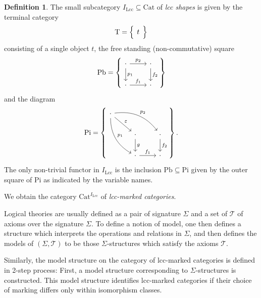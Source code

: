 \documentclass[a4paper]{article}
\theoremstyle{remark}
\theoremstyle{definition}
\newtheorem{definition}[theorem]{Definition}
\begin{document}
\begin{definition}
  The small subcategory $I_\mathrm{Lcc} \subseteq \mathrm{Cat}$ of \emph{lcc shapes} is given by the terminal category 
  \begin{equation}
    \mathrm{T} =
    \left\{
      \begin{tikzcd}
        t
      \end{tikzcd}
    \right\}
  \end{equation}
  consisting of a single object $t$, the free standing (non-commutative) square
  \begin{equation}
    \mathrm{Pb} =
    \left\{
      \begin{tikzcd}
        \cdot \arrow[d, "p_1"] \arrow[r, "p_2"] & \cdot \arrow[d, "f_2"] \\
        \cdot \arrow[r, "f_1"] & \cdot
      \end{tikzcd}
    \right\}
  \end{equation}
  and the diagram
  \begin{equation}
    \mathrm{Pi} =
    \left\{
      \begin{tikzcd}
        \cdot \arrow[ddr, bend right, "p_1"] \arrow[drr, bend left, "p_2"] \arrow[dr, "\varepsilon"] \\
        & \cdot \arrow[d, "g"] & \cdot \arrow[d, "f_2"] \\
        & \cdot \arrow[r, "f_1"] & \cdot
      \end{tikzcd}
    \right\}.
  \end{equation}
  The only non-trivial functor in $I_\mathrm{Lcc}$ is the inclusion $\mathrm{Pb} \subseteq \mathrm{Pi}$ given by the outer square of $\mathrm{Pi}$ as indicated by the variable names.

  We obtain the category $\mathrm{Cat}^{I_\mathrm{Lcc}}$ of \emph{lcc-marked categories}.
\end{definition}

Logical theories are usually defined as a pair of signature $\Sigma$ and a set of $\mathcal{T}$ of axioms over the signature $\Sigma$.
To define a notion of model, one then defines a structure which interprets the operations and relations in $\Sigma$, and then defines the models of $(\Sigma, \mathcal{T})$ to be those $\Sigma$-structures which satisfy the axioms $\mathcal{T}$.

Similarly, the model structure on the category of lcc-marked categories is defined in 2-step process:
First, a model structure corresponding to $\Sigma$-structures is constructed.
This model structure identifies lcc-marked categories if their choice of marking differs only within isomorphism classes.
\end{document}

